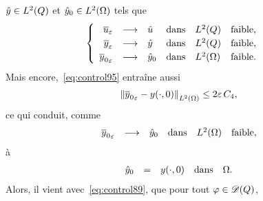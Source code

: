 $\hat{y}\in L^{2}\!\left({Q}\right)$ et ${\hat{y}}_{0}\in L^{2}\!\left({\Omega}\right)$ tels que
\begin{equation*}
    \begin{cases}\displaystyle
        \begin{array}{rcllll}
            {\overline{u}}_{\varepsilon} & \longrightarrow & \hat{u} & \text{dans} &
            L^{2}\!\left({Q}\right) & \text{faible},\\
            {\overline{y}}_{\varepsilon} & \longrightarrow & \hat{y} & \text{dans} &
            L^{2}\!\left({Q}\right) & \text{faible},\\
            {\overline{y}_{0}}_{\varepsilon} & \longrightarrow & {\hat{y}}_{0} &
            \text{dans} & L^{2}\!\left({\Omega}\right) & \text{faible}.
        \end{array}
    \end{cases}
\end{equation*}
Mais encore,~\eqref{eq:control95} entraîne aussi
\begin{equation}\label{eq:control106}
    {\left\|{{\overline{y}_{0}}_{\varepsilon} -  {y}\!\left({\cdot, 0}\right)  }\right\|}_{L^{2}\left({\Omega}\right)} \leq 2\varepsilon\,C_{4},
\end{equation}
ce qui conduit, comme
\begin{equation}\label{eq:control106p}
    \begin{array}{rcllll}
        {\overline{y}_{0}}_{\varepsilon} & \longrightarrow & {\hat{y}}_{0} &
        \text{dans} & L^{2}\!\left({\Omega}\right) & \text{faible},
    \end{array}
\end{equation}
à
\begin{equation}\label{eq:control107}
    \begin{array}{rclll}
        {\hat{y}}_{0} & = & {y}\!\left({\cdot, 0}\right) & \text{dans} & \Omega.
    \end{array}
\end{equation}
Alors, il vient avec~\eqref{eq:control89}, que pour tout
$\varphi\in\mathscr{D}(Q)$,
